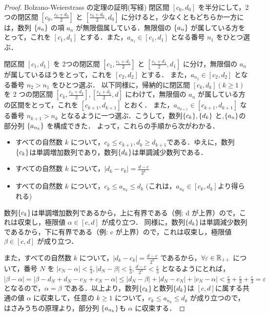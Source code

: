 \documentclass[a4paper]{ltjsarticle}
\begin{document}
   \begin{proof}{Bolzano-Weierstrass の定理の証明(写経)}{}
    閉区間 $[c_0, d_0]$ を半分にして，2つの閉区間 $[c_0, \frac{c_0 + d_0}{2}]$ と $[\frac{c_0 + d_0}{2}, d_0]$ に分けると，少なくともどちらか一方には，数列 $\{a_n\}$ の項 $a_n$ が無限個属している．無限個の $\{a_n\}$ が属している方をとって，これを $[c_1, d_1]$ とする．また，$a_{n_1} \in [c_1, d_1]$ となる番号 $n_1$ をひとつ選ぶ．

    閉区間 $[c_1, d_1]$ を 2つの閉区間 $[c_1, \frac{c_1 + d_1}{2}]$ と $[\frac{c_1 + d_1}{2}, d_1]$ に分け，無限個の $a_n$ が属しているほうをとって，これを $[c_2, d_2]$ とする．
    また，$a_{n_2} \in [c_2, d_2]$ となる番号 $n_2 > n_1$ をひとつ選ぶ．
    以下同様に，帰納的に閉区間 $[c_k, d_k] (k \geq 1)$ を 2 つの閉区間 $[c_k, \frac{c_k + d_k}{2}], [\frac{c_k + d_k}{2}, d]$ にわけて，無限個の $a_n$ が属している方の区間をとって，これを $[c_{k + 1}, d_{k + 1}]$ とおく．
    また，$a_{n_{k + 1}} \in [c_{k+1}, d_{k+1}]$ なる番号 $n_{k+1} > n_k$ となるように一つ選ぶ．こうして，数列$\{c_k\}, \{d_k\}$ と,$ \{a_n\}$の部分列 $\{a_{n_k}\}$ を構成できた．
    よって，これらの手順から次がわかる．
    \begin{itemize}
      \item すべての自然数 $k$ について，$c_k \leq c_{k+1}, d_{k} \geq d_{k+1}$である．ゆえに，数列 $\{c_k\}$は単調増加数列であり，数列$\{d_k\}$は単調減少数列である．
      \item すべての自然数 $k$ について，$|d_k - c_k| = \frac{d-c}{2^k}$
      \item すべての自然数 $k$ について，$c_k \leq a_{n_k} \leq d_k$ (これは，$a_{n_k} \in [c_k, d_k]$より得られる)
     \end{itemize}

     数列$\{c_k\}$は単調増加数列であるから，上に有界である（例: d が上界）ので，これは収束し，極限値 $\alpha \in [c, d]$ が成り立つ．
     同様に，数列$\{d_k\}$は単調減少数列であるから，下に有界である（例: c が上界）ので，これは収束し，極限値 $\beta \in [c, d]$ が成り立つ．

     また，すべての自然数 $k$ について，$|d_k - c_k| = \frac{d-c}{2^k}$ であるから，$\forall \varepsilon \in \mathbb{R}_{++}$ について，番号 $N$ を $|c_N - \alpha| < \frac{\varepsilon}{3}, |d_N - \beta| < \frac{\varepsilon}{3}, \frac{d - c}{2^n} < \frac{\varepsilon}{3}$ となるようにとれば，
     $|\beta - \alpha| = |\beta - d_N + d_N - c_N + c_N - \alpha| \leq |d_N - \beta| + |d_N - c_N| + |c_N - \alpha| < \frac{\varepsilon}{3} + \frac{\varepsilon}{3} + \frac{\varepsilon}{3} = \varepsilon$
     となるので，$\alpha = \beta$ である．以上より，数列$\{c_k\}$と数列$\{d_k\}$は $[c, d]$に属する共通の値 $\alpha$ に収束して，任意の $k \geq 1$ について，$c_k \leq a_{n_k} \leq d_k$ が成り立つので，はさみうちの原理より，部分列 $\{a_{n_k}\}$も $\alpha$ に収束する．
   \end{proof}
\end{document}

